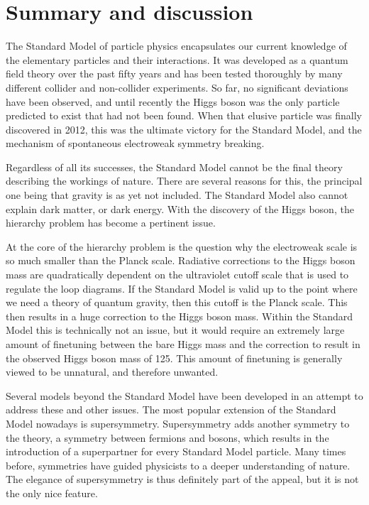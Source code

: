 \chapter{Summary and discussion \label{chap:summary}}

The Standard Model of particle physics encapsulates our current knowledge of the elementary
particles and their interactions. It was developed as a quantum field theory
over the past fifty years and has been tested thoroughly by many different collider and
non-collider experiments. So far, no significant deviations have been observed, and until recently
the Higgs boson was the only particle predicted to exist that had not been found. 
When that elusive particle was finally discovered in 2012, this was the ultimate victory for the
Standard Model, and the mechanism of spontaneous electroweak symmetry breaking. 

Regardless of all its successes, the Standard Model cannot be the final theory describing the
workings of nature. There are several reasons for this, the principal one being that gravity is
as yet not included. The Standard Model also cannot explain dark matter, or dark energy. 
With the discovery of the Higgs boson, the hierarchy problem has become a pertinent issue. 

At the core of the hierarchy problem is the question why the electroweak scale is so much smaller
than the Planck scale. Radiative corrections to the Higgs boson mass are quadratically dependent on
the ultraviolet cutoff scale that is used to regulate the loop diagrams. If the Standard Model is
valid up to the point where we need a theory of quantum gravity, then this cutoff is the
Planck scale. This then results in a huge correction to the Higgs boson mass. Within the Standard
Model this is technically not an issue, but it would require an extremely large amount of
finetuning between the bare Higgs mass and the correction to result in the observed Higgs boson
mass of 125\GeV. This amount of finetuning is generally viewed to be unnatural, and therefore
unwanted. 

Several models beyond the Standard Model have been developed in an attempt to address these and
other issues. The most popular extension of the Standard Model nowadays is supersymmetry.
Supersymmetry adds another symmetry to the theory, a symmetry between fermions and bosons, which
results in the introduction of a superpartner for every Standard Model particle. 
Many times before, symmetries have guided physicists to a deeper understanding of nature. 
The elegance of supersymmetry is thus definitely part of the appeal, but it is not the only nice
feature. 

